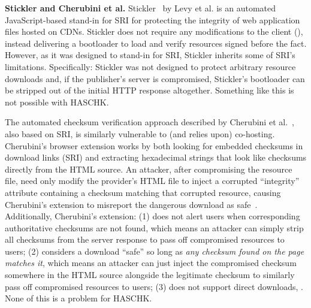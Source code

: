\noindent\textbf{Stickler and Cherubini et al.} Stickler~\cite{Stickler} by Levy
et al. is an automated JavaScript-based stand-in for SRI for protecting the
integrity of web application files hosted on CDNs. Stickler does not require any
modifications to the client (), instead delivering a bootloader
to load and verify resources signed before the fact. However, as it was designed
to stand-in for SRI, Stickler inherits some of SRI's limitations. Specifically:
Stickler was not designed to protect arbitrary resource downloads and, if the
publisher's server is compromised, Stickler's bootloader can be stripped out of
the initial HTTP response altogether. Something like this is not possible with
HASCHK.

The automated checksum verification approach described by Cherubini et
al.~\cite{Cherubini}, also based on SRI, is similarly vulnerable to (and relies
upon) co-hosting. Cherubini's browser extension works by both looking for
embedded checksums in download links (SRI) and extracting hexadecimal strings
that look like checksums directly from the HTML source. An attacker, after
compromising the resource file, need only modify the provider's HTML file to
inject a corrupted ``integrity'' attribute containing a checksum matching that
corrupted resource, causing Cherubini's extension to misreport the dangerous
download as safe~\cite{Cherubini}. Additionally, Cherubini's extension: (1) does
not alert users when corresponding authoritative checksums are not found, which
means an attacker can simply strip all checksums from the server response to
pass off compromised resources to users; (2) considers a download ``safe'' so
long as \emph{any checksum found on the page matches it}, which means an
attacker can just inject the compromised checksum somewhere in the HTML source
alongside the legitimate checksum to similarly pass off compromised resources to
users; (3) does not support direct downloads, . None of
this is a problem for HASCHK.
